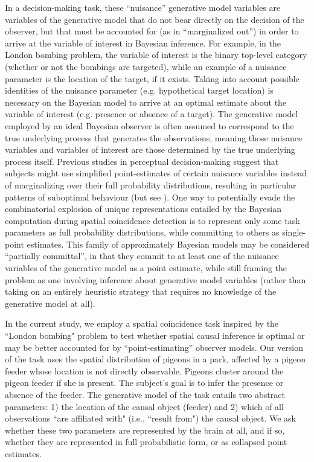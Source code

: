 \documentclass{article}
\begin{document}
In a decision-making task, these ``nuisance'' generative model variables are variables of the generative model that do not bear directly on the decision of the observer, but that must be accounted for (as in ``marginalized out'') in order to arrive at the variable of interest in Bayesian inference. For example, in the London bombing problem, the variable of interest is the binary top-level category (whether or not the bombings are targeted), while an example of a nuisance parameter is the location of the target, if it exists. Taking into account possible identities of the nuisance parameter (e.g. hypothetical target location) is necessary on the Bayesian model to arrive at an optimal estimate about the variable of interest (e.g. presence or absence of a target). The generative model employed by an ideal Bayesian observer is often assumed to correspond to the true underlying process that generates the observations, meaning those nuisance variables and variables of interest are those determined by the true underlying process itself. Previous studies in perceptual decision-making \cite{fleming2013irrationality, murphy2012reasoning} suggest that subjects might use simplified point-estimates of certain nuisance variables instead of marginalizing over their full probability distributions, resulting in particular patterns of suboptimal behaviour (but see \cite{shen2016detailed}). One way to potentially evade the combinatorial explosion of unique representations entailed by the Bayesian computation during spatial coincidence detection is to represent only some task parameters as full probability distributions, while committing to others as single-point estimates. This family of approximately Bayesian models may be considered  ``partially committal'', in that they commit to at least one of the nuisance variables of the generative model as a point estimate, while still framing the problem as one involving inference about generative model variables (rather than taking on an entirely heuristic strategy that requires no knowledge of the generative model at all).

In the current study, we employ a spatial coincidence task inspired by the ``London bombing"  problem to test whether spatial causal inference is optimal or may be better accounted for by ``point-estimating'' observer models. Our version of the task uses the spatial distribution of pigeons in a park, affected by a pigeon feeder whose location is not directly observable. Pigeons cluster around the pigeon feeder if she is present. The subject's goal is to infer the presence or absence of the feeder. The generative model of the task entails two abstract parameters: 1) the location of the causal object (feeder) and 2) which of all observations ``are affiliated with" (i.e., ``result from") the causal object. We ask whether these two parameters are represented by the brain at all, and if so, whether they are represented in full probabilistic form, or as collapsed point estimates. 
\end{document}
